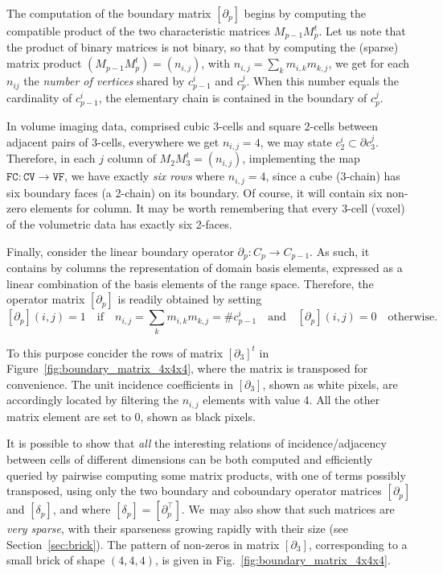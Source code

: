 The computation of the boundary matrix $[\partial_p]$ begins by computing the compatible product of the two characteristic matrices $M_{p-1}M_{p}^t$.
Let us note that the product of binary matrices is not binary, so that by computing the (sparse) matrix product $(M_{p-1} M_{p}^t) = (n_{i,j})$, with $n_{i,j} = \sum_{k} m_{i,k}m_{k,j}$, we get for each $n_{ij}$ the \emph{number of vertices} shared by $c_{p-1}^i$ and $c_{p}^j$. When this number equals the cardinality of $c_{p-1}^i$, the elementary chain is contained in the boundary of $c_{p}^j$. 

In volume imaging data, comprised cubic 3-cells and square 2-cells between adjacent pairs of 3-cells, everywhere we get  $n_{i,j}=4$, we may state $c_{2}^i\subset\partial c_{3}^j$. 
Therefore, in each $j$ column of $M_{2} M_{3}^t = (n_{i,j})$, implementing the map $\texttt{FC} : \texttt{CV} \to \texttt{VF}$, we have exactly \emph{six rows} where  $n_{i,j} = 4$, since a cube (3-chain) has six boundary faces (a 2-chain) on its boundary. 
Of course, it will contain six non-zero elements for column.  It may be worth remembering that every 3-cell (voxel) of the volumetric data has exactly six 2-faces. 

Finally, consider the linear boundary operator $\partial_p : C_p \to C_{p-1}$. As such, it contains by columns the representation of domain basis elements, expressed as a linear combination of the basis elements of the range space. Therefore, the operator matrix $[\partial_p]$ is readily obtained by setting 
\[
[\partial_p](i,j)=1\quad\mbox{if}\quad n_{i,j} = \sum_{k} m_{i,k}m_{k,j}=\texttt{\#}c^i_{p-1} \quad\mbox{and}\quad [\partial_p](i,j)=0 \quad\mbox{otherwise}.  
\]

To this purpose concider the rows of matrix $[\partial_3]^t$ in Figure~\ref{fig:boundary_matrix_4x4x4}, where the matrix is  transposed for convenience.
The unit incidence coefficients in $\left[\partial_3\right]$, shown as white pixels, are accordingly located by filtering the $n_{i,j}$ elements with value 4. All the other matrix element are set to 0, shown as black pixels. 

It is possible to show that \emph{all} the interesting relations of incidence/adjacency between cells of different dimensions can be both computed and efficiently queried by pairwise computing some matrix products, with one of terms possibly transposed, using only the two boundary and coboundary operator matrices $[\partial_p]$ and $[\delta_p]$, and where $[\delta_p] = [\partial_p^\top]$. We~may also show that such matrices are \emph{very sparse}, with their sparseness growing rapidly with their size (see Section~\ref{sec:brick}). The pattern of non-zeros in matrix $[\partial_3]$, corresponding to a small brick of shape $(4,4,4)$, is given in Fig.~\ref{fig:boundary_matrix_4x4x4}.

